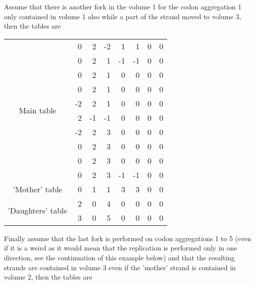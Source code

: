 Assume that there is another fork in the volume 1 for the codon aggregation 1 only contained in volume 1 also while a part of the strand moved to volume 3, then the tables are
\begin{center}
  \begin{tabular}{|c|r|r|r|r|r|r|r|}
     \hline
     \multirow{10}{*}{Main table} & 0 &  2 & -2 &  1 &  1 & 0 & 0 \\
     &  0 &  2 &  1 & -1 & -1 & 0 & 0 \\
     &  0 &  2 &  1 &  0 &  0 & 0 & 0 \\
     &  0 &  2 &  1 &  0 &  0 & 0 & 0 \\
     & -2 &  2 &  1 &  0 &  0 & 0 & 0 \\
     &  2 & -1 & -1 &  0 &  0 & 0 & 0 \\
     & -2 &  2 &  3 &  0 &  0 & 0 & 0 \\
     &  0 &  2 &  3 &  0 &  0 & 0 & 0 \\
     &  0 &  2 &  3 &  0 &  0 & 0 & 0 \\
     &  0 &  2 &  3 & -1 & -1 & 0 & 0 \\
     \hline \hline
     'Mother' table & 0 & 1 & 1 & 3 & 3 & 0 & 0 \\
     \hline \hline
     \multirow{2}{*}{'Daughters' table} & 2 & 0 & 4 & 0 & 0 & 0 & 0 \\
     & 3 & 0 & 5 & 0 & 0 & 0 & 0 \\
     \hline
   \end{tabular}
\end{center}
Finally assume that the last fork is performed on codon aggregations 1 to 5 (even if it is a weird as it would mean that the replication is performed only in one direction, see the continuation of this example below) and that the resulting strands are contained in volume 3 even if the 'mother' strand is contained in volume 2, then the tables are

